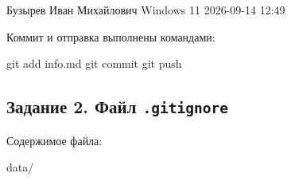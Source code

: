 \documentclass[a4paper,14pt]{extarticle}
\begin{document}
\begin{code}
Бузырев Иван Михайлович
Windows 11
2026-09-14 12:49
\end{code}

Коммит и отправка выполнены командами:

\begin{code}
git add info.md
git commit
git push
\end{code}

\subsection{Задание 2. Файл \texttt{.gitignore}}

Содержимое файла:

\begin{code}
data/
\end{code}
\end{document}
